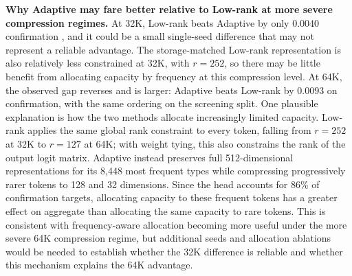 \documentclass[10pt,a4paper]{article}
\newcommand{\bpb}{\text{BPB}}
\begin{document}
\textbf{Why Adaptive may fare better relative to Low-rank at more severe compression regimes.} At 32K, Low-rank beats Adaptive by only 0.0040 confirmation \bpb{}, and it could be
a small single-seed difference that may not represent a reliable advantage. The storage-matched Low-rank representation is also relatively 
less constrained at 32K, with $r=252$, so there may be little benefit from allocating capacity by frequency at this compression level. 
At 64K, the observed gap reverses and is larger: Adaptive beats Low-rank by 0.0093 \bpb{} on confirmation, with the same ordering on the 
screening split. One plausible explanation is how the two methods allocate increasingly limited capacity. Low-rank applies the same global 
rank constraint to every token, falling from $r=252$ at 32K to $r=127$ at 64K; with weight tying, this also constrains the rank of the output 
logit matrix. Adaptive instead preserves full 512-dimensional representations for its 8,448 most frequent types while compressing progressively 
rarer tokens to 128 and 32 dimensions. Since the head accounts for 86\% of confirmation targets, allocating capacity to these frequent tokens 
has a greater effect on aggregate \bpb{} than allocating the same capacity to rare tokens. This is consistent with frequency-aware allocation 
becoming more useful under the more severe 64K compression regime, but additional seeds and allocation ablations would be needed to establish whether the
32K difference is reliable and whether this mechanism explains the 64K advantage.
\end{document}
